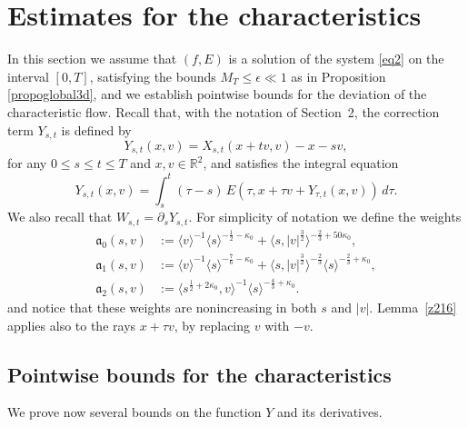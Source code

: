 \documentclass[reqno,11pt]{amsart}
\numberwithin{equation}{section}
\def\R{{\mathbb R}}
\def\R{{\bf R}}
\def\R{\mathbb{R}}
\begin{document}
	\section{Estimates for the characteristics}\label{section4}
	In this section we assume that $(f,E)$ is a solution of the system \eqref{eq2} on the interval $[0,T]$, satisfying the bounds $M_T\leq\epsilon\ll 1$ as in Proposition \ref{propoglobal3d}, and we establish pointwise bounds for the deviation of the
characteristic flow. Recall that, with the notation of Section~2,
	the correction term $Y_{s,t}$ is defined by
	\[
	Y_{s,t}(x,v)=X_{s,t}(x+tv,v)-x-sv,
	\]
        for any $0\le s\le t\le T$ and $x,v\in\R^2$, and satisfies the integral equation
	\begin{equation}\label{Yinteq}
	Y_{s,t}(x,v)=\int_s^t(\tau-s)\,E(\tau,x+\tau v+Y_{\tau,t}(x,v))\,d\tau.
	\end{equation}
	We also recall that $W_{s,t}=\partial_s Y_{s,t}$. For simplicity of notation we define the weights
	\begin{equation}\label{aweights}
	\begin{split}
		\mathfrak a_0(s,v)&:=\langle v\rangle^{-1}\langle s\rangle^{-\frac12-\kappa_0}
		+\langle s,|v|^{\frac32}\rangle^{-\frac23+50\kappa_0},\\
		\mathfrak a_1(s,v)&:=\langle v\rangle^{-1}\langle s\rangle^{-\frac76-\kappa_0}+\langle s,|v|^{\frac32}\rangle^{-\frac23}
		\langle s\rangle^{-\frac23+\kappa_0},\\
		\mathfrak a_2(s,v)&:=\langle s^{\frac12+2\kappa_0},v\rangle^{-1}
		\langle s\rangle^{-\frac43+\kappa_0}.
	\end{split}
	\end{equation}
	and notice that these weights are nonincreasing in both $s$ and $|v|$.
	Lemma~\ref{z216} applies also to the rays $x+\tau v$, by replacing $v$ with $-v$.
	\medskip
	\subsection{Pointwise bounds for the characteristics} We prove now several bounds on the function $Y$ and its derivatives.
	
	
	
\end{document}

